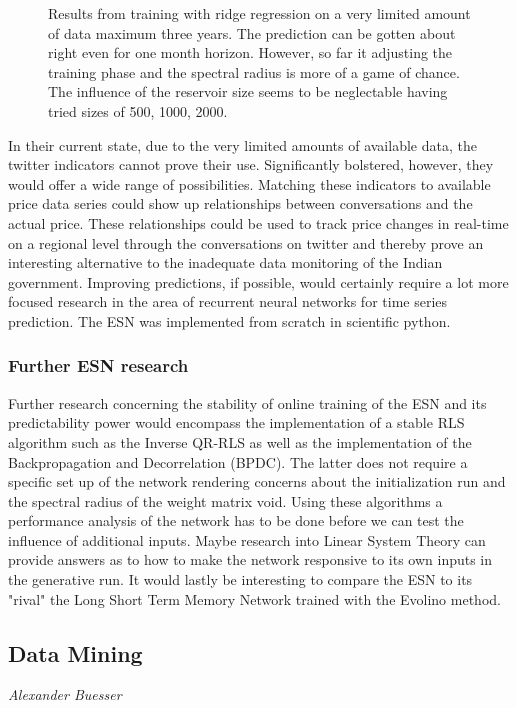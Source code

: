 \begin{figure}[!ht]
    \caption{Results from training with ridge regression on a very limited amount of data maximum three years. The prediction can be gotten about right even for one month horizon. However, so far it adjusting the training phase and the spectral radius is more of a game of chance. The influence of the reservoir size seems to be neglectable having tried sizes of 500, 1000, 2000.}
    \label{fig:res_chance}
\end{figure}

In their current state, due to the very limited amounts of available data, the twitter indicators cannot prove their use. Significantly bolstered, however, they would offer a wide range of possibilities. Matching these indicators to available price data series could show up relationships between conversations and the actual price. These relationships could be used to track price changes in real-time on a regional level through the conversations on twitter and thereby prove an interesting alternative to the inadequate data monitoring of the Indian government. Improving predictions, if possible, would certainly require a lot more focused research in the area of recurrent neural networks for time series prediction. The ESN was implemented from scratch in scientific python.

\subsubsection*{Further ESN research}
Further research concerning the stability of online training of the ESN and its predictability power would encompass the implementation of a stable RLS algorithm such as the Inverse QR-RLS as well as the implementation of the Backpropagation and Decorrelation (BPDC). The latter does not require a specific set up of the network rendering concerns about the initialization run and the spectral radius of the weight matrix void. Using these algorithms a performance analysis of the network has to be done before we can test the influence of additional inputs. Maybe research into Linear System Theory can provide answers as to how to make the network responsive to its own inputs in the generative run. It would lastly be interesting  to compare the ESN to its "rival" the Long Short Term Memory Network trained with the Evolino method.

\subsection*{Data Mining}
\emph{Alexander Buesser} \\

